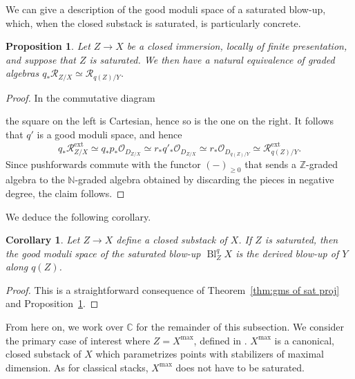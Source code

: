 \documentclass[a4paper,twoside,11pt]{amsart}
\theoremstyle{plain}
\newtheorem{proposition}[theorem]{Proposition}
\newtheorem{corollary}[theorem]{Corollary}
\theoremstyle{definition}
\theoremstyle{remark}
\numberwithin{equation}{section}
\newcommand{\NN}{\mathbb{N}} %
\newcommand{\ZZ}{\mathbb{Z}} %
\newcommand{\CC}{\mathbb{C}} %
\newcommand\sO{\mathcal{O}} %
\DeclareMathOperator{\Bl}{Bl}
\newcommand{\extd}{\mathrm{ext}} %
\newcommand{\rR}{\mathcal{R}}
\begin{document}
We can give a description of the good moduli space of a saturated blow-up, which, when the closed substack is saturated, is particularly concrete.


\begin{proposition} \label{prop: push of Rees of sat}
    Let $Z \to X$ be a closed immersion, locally of finite presentation, and suppose that $Z$ is saturated. We then have a natural equivalence of graded algebras $q_\ast \rR_{Z/X} \simeq \rR_{q(Z)/Y}$.
\end{proposition}

\begin{proof}
    In the commutative diagram
    \begin{center}
    \end{center}
    the square on the left is Cartesian, hence so is the one on the right. It follows that $q'$ is a good moduli space, and hence
    \[ q_*\rR_{Z/X}^{\extd} \simeq q_*p_* \sO_{D_{Z/X}} \simeq r_*q'_*\sO_{D_{Z/X}} \simeq r_* \sO_{D_{q(Z)/Y}} \simeq \rR_{q(Z)/Y}^{\extd}. \]
    Since pushforwards commute with the functor $(-)_{\geq 0}$ that sends a $\ZZ$-graded algebra to the $\NN$-graded algebra obtained by discarding the pieces in negative degree, the claim follows. 
\end{proof}

We deduce the following corollary.

\begin{corollary} \label{cor:cor 4.7}
    Let $Z \to X$ define a closed substack of $X$. If $Z$ is saturated, then the good moduli space of the saturated blow-up $\Bl_Z^q X$ is the derived blow-up of $Y$ along $q(Z)$. 
\end{corollary}

\begin{proof}
    This is a straightforward consequence of Theorem~\ref{thm:gms of sat proj} and Proposition~\ref{prop: push of Rees of sat}.
\end{proof}

From here on, we work over $\CC$ for the remainder of this subsection. We consider the primary case of interest where $Z = X^{\max}$, defined in \cite[Theorem~4.14, Definition~4.15]{HRS}. $X^{\max}$ is a canonical, closed substack of $X$ which parametrizes points with stabilizers of maximal dimension. As for classical stacks, $X^{\max}$ does not have to be saturated. 
\end{document}
